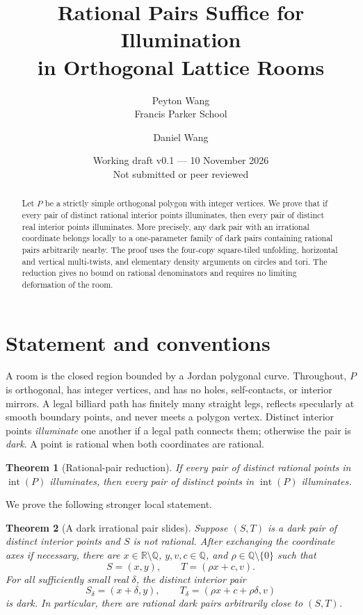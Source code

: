 \documentclass[11pt]{article}
\title{Rational Pairs Suffice for Illumination\\in Orthogonal Lattice Rooms}
\author{Peyton Wang\\\small Francis Parker School \and Daniel Wang}
\date{Working draft v0.1 --- 10 November 2026\\\small Not submitted or peer reviewed}
\newtheorem{theorem}{Theorem}
\theoremstyle{remark}
\newcommand{\Q}{\mathbb Q}
\newcommand{\R}{\mathbb R}
\newcommand{\interior}{\operatorname{int}}
\begin{document}
\maketitle
\begin{abstract}
Let $P$ be a strictly simple orthogonal polygon with integer vertices.
We prove that if every pair of distinct rational interior points illuminates,
then every pair of distinct real interior points illuminates.
More precisely, any dark pair with an irrational coordinate belongs locally
to a one-parameter family of dark pairs containing rational pairs arbitrarily
nearby. The proof uses the four-copy square-tiled unfolding, horizontal and
vertical multi-twists, and elementary density arguments on circles and tori.
The reduction gives no bound on rational denominators and requires no
limiting deformation of the room.
\end{abstract}

\section{Statement and conventions}
A room is the closed region bounded by a Jordan polygonal curve.
Throughout, $P$ is orthogonal, has integer vertices, and has no holes,
self-contacts, or interior mirrors. A legal billiard path has finitely many
straight legs, reflects specularly at smooth boundary points, and never
meets a polygon vertex. Distinct interior points \emph{illuminate} one another
if a legal path connects them; otherwise the pair is \emph{dark}.
A point is rational when both coordinates are rational.

\begin{theorem}[Rational-pair reduction]\label{thm:reduction}
If every pair of distinct rational points in $\interior(P)$ illuminates,
then every pair of distinct points in $\interior(P)$ illuminates.
\end{theorem}

We prove the following stronger local statement.
\begin{theorem}[A dark irrational pair slides]\label{thm:slide}
Suppose $(S,T)$ is a dark pair of distinct interior points and $S$ is not
rational. After exchanging the coordinate axes if necessary, there are
$x\in\R\setminus\Q$, $y,v,c\in\Q$, and $\rho\in\Q\setminus\{0\}$ such that
\[
 S=(x,y),\qquad T=(\rho x+c,v).
\]
For all sufficiently small real $\delta$, the distinct interior pair
\[
 S_\delta=(x+\delta,y),\qquad
 T_\delta=(\rho x+c+\rho\delta,v)
\]
is dark. In particular, there are rational dark pairs arbitrarily close
to $(S,T)$.
\end{theorem}
\end{document}
